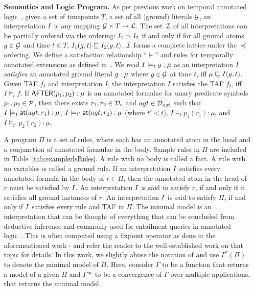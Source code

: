 \noindent\textbf{Semantics and Logic Program.} As per previous work on temporal annotated logic~\cite{shakAamas13,aditya2023pyreason,bavikadi2024geospatial}, given a set of timepoints $T$, a set of all (ground) literals $\mathcal{G}$, an interpretation $I$ is any mapping $\mathcal{G} \times T \to \mathcal{L}$. 
The set~$\mathcal{I}$ of all interpretations can be partially ordered via the ordering: $I_1\preceq I_2$ if and only if for all ground atoms $g \in \mathcal{G}$ and time $t \in T$, $I_1(g, t)\sqsubseteq I_2(g, t)$. $\mathcal{I}$ forms a complete lattice under the $\preceq$ ordering. We define a satisfaction relationship ``$\models$'' and rules for temporally annotated extensions as defined in~\cite{shakAamas13, aditya2023pyreason}.  
We read $ I \models_{t} g:\mu$ as an interpretation $I$ \emph{satisfies} an annotated ground literal $g:\mu$ where $g \in \mathcal{G}$ at time $t$, iff $\mu \sqsubseteq I( g, t)$.
Given TAF $f_t$ and interpretation $I$, the interpretation $I$ satisfies the TAF $f_t$, iff $I \models_t f$. 
If $\textsf{AFTER}( p_1,p_2): \mu$ is an annotated formulae for unary predicate symbols $p_1,p_2 \in \mathcal{P}$, then there exists $r_1,r_2 \in \mathcal{D}_{r}$ and $agt \in \mathcal{D}_{agt}$ such that $I \models_{t} \textsf{at}(agt,r_1): \mu$, $I \models_{t'} \textsf{at}(agt,r_2): \mu$ (where $t' < t$),  $I \models_{t} p_1(r_1):\mu$, and $I \models_{t'} p_2(r_2):\mu$.


A program $\Pi$ is a set of rules, where each has an annotated atom in the head and a conjunction of annotated formulae in the body. Sample rules in $\Pi$ are included in Table~\ref{tab:examplerlsRules}. A rule with no body is called a fact. A rule with no variables is called a ground rule. If an interpretation $I$ satisfies every annotated formula in the body of $r \in \Pi$, then the annotated atom in the head of $r$ must be satisfied by $I$. An interpretation $I$ is said to satisfy $r$, if and only if it satisfies all ground instances of $r$. An interpretation $I$ is said to satisfy $\Pi$, if and only if $I$ satisfies every rule and TAF in $\Pi$.  The minimal model is an interpretation that can be thought of everything that can be concluded from deductive inference and commonly used for entailment queries in annotated logic~\cite{ks92,shakAamas13,ssTAI22,aditya2023pyreason}.  This is often computed using a fixpoint operator as done in the aforementioned work - and refer the reader to the well-established work on that topic for details.  In this work, we slightly abuse the notation of \cite{ks92} and use $\Gamma^*(\Pi)$ to denote the minimal model of $\Pi$. Here, consider $\Gamma$ to be a function that returns a model of a given $\Pi$ and $\Gamma*$ to be a convergence of $\Gamma$ over multiple applications, that returns the minimal model.

